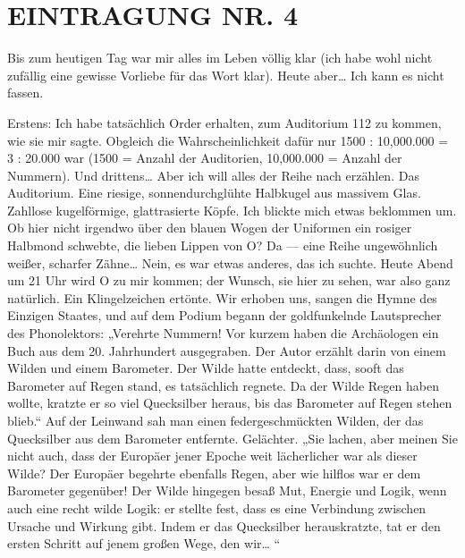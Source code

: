 \section{EINTRAGUNG NR. 4}

Bis zum heutigen Tag war mir alles im Leben völlig klar (ich habe
wohl nicht zufällig eine gewisse Vorliebe für das Wort klar). Heute
aber\ldots{} Ich kann es nicht fassen.

Erstens: Ich habe tatsächlich Order erhalten, zum Auditorium 112 zu
kommen, wie sie mir sagte. Obgleich die Wahrscheinlichkeit dafür
nur 1500 : 10,000.000 = 3 : 20.000 war (1500 = Anzahl der
Auditorien, 10,000.000 = Anzahl der Nummern). Und drittens\ldots{} Aber
ich will alles der Reihe nach erzählen. Das Auditorium. Eine
riesige, sonnendurchglühte Halbkugel aus massivem Glas. Zahllose
kugelförmige, glattrasierte Köpfe. Ich blickte mich etwas beklommen
um. Ob hier nicht irgendwo über den blauen Wogen der Uniformen ein
rosiger Halbmond schwebte, die lieben Lippen von O? Da — eine Reihe
ungewöhnlich weißer, scharfer Zähne\ldots{} Nein, es war etwas anderes,
das ich suchte. Heute Abend um 21 Uhr wird O zu mir kommen; der
Wunsch, sie hier zu sehen, war also ganz natürlich. Ein
Klingelzeichen ertönte. Wir erhoben uns, sangen die Hymne des
Einzigen Staates, und auf dem Podium begann der goldfunkelnde
Lautsprecher des Phonolektors: „Verehrte Nummern! Vor kurzem haben
die Archäologen ein Buch aus dem 20. Jahrhundert ausgegraben. Der
Autor erzählt darin von einem Wilden und einem Barometer. Der Wilde
hatte entdeckt, dass, sooft das Barometer auf Regen stand, es
tatsächlich regnete. Da der Wilde Regen haben wollte, kratzte er so
viel Quecksilber heraus, bis das Barometer auf Regen stehen blieb.“
Auf der Leinwand sah man einen federgeschmückten Wilden, der das
Quecksilber aus dem Barometer entfernte. Gelächter. „Sie lachen,
aber meinen Sie nicht auch, dass der Europäer jener Epoche weit
lächerlicher war als dieser Wilde? Der Europäer begehrte ebenfalls
Regen, aber wie hilflos war er dem Barometer gegenüber! Der Wilde
hingegen besaß Mut, Energie und Logik, wenn auch eine recht wilde
Logik: er stellte fest, dass es eine Verbindung zwischen Ursache
und Wirkung gibt. Indem er das Quecksilber herauskratzte, tat er
den ersten Schritt auf jenem großen Wege, den wir\ldots{} “

